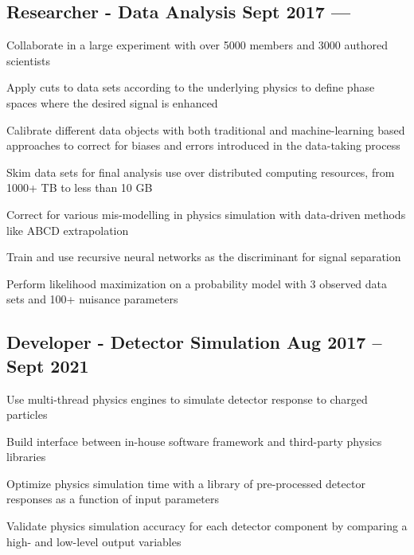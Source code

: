 \documentclass[letter,10pt]{article}
\begin{document}
\subsection{{Researcher - Data Analysis  \hfill Sept 2017 --- }}
\begin{zitemize}
\item Collaborate in a large experiment with over 5000 members and 3000 authored scientists 
\item Apply cuts to data sets according to the underlying physics to define phase spaces where the desired signal is enhanced
\item Calibrate different data objects with both traditional and machine-learning based approaches to correct for biases and errors introduced in the data-taking process
\item Skim data sets for final analysis use over distributed computing resources, from  1000+ TB to less than 10 GB
\item Correct for various mis-modelling in physics simulation with data-driven methods like ABCD extrapolation
\item Train and use recursive neural networks as the discriminant for signal separation 
\item Perform likelihood maximization on a probability model with 3 observed data sets and 100+ nuisance parameters
\end{zitemize}
\subsection{{Developer - Detector Simulation  \hfill Aug 2017 -- Sept 2021 }}
\begin{zitemize}
\item Use multi-thread physics engines to simulate detector response to charged particles
\item Build interface between in-house software framework and third-party physics libraries
\item Optimize physics simulation time with a library of pre-processed detector responses as a function of input parameters
\item Validate physics simulation accuracy for each detector component by comparing a high- and low-level output variables
\end{zitemize}
\end{document}
